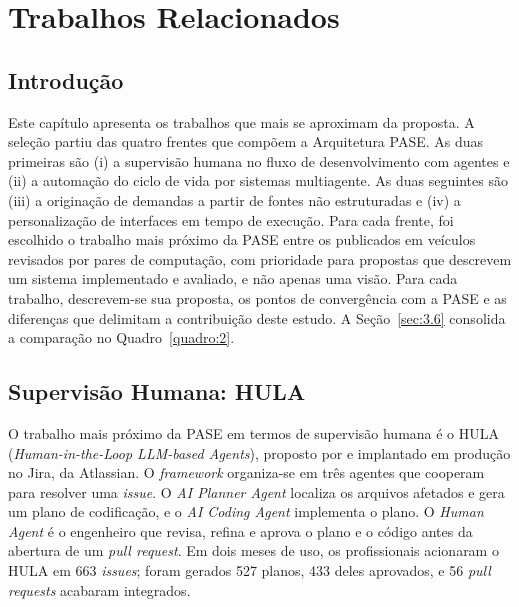 
\chapter{Trabalhos Relacionados}\label{cap:3}

\section{Introdução}\label{sec:3.1}

Este capítulo apresenta os trabalhos que mais se aproximam da proposta. A seleção partiu das quatro frentes que compõem a Arquitetura PASE. As duas primeiras são (i) a supervisão humana no fluxo de desenvolvimento com agentes e (ii) a automação do ciclo de vida por sistemas multiagente. As duas seguintes são (iii) a originação de demandas a partir de fontes não estruturadas e (iv) a personalização de interfaces em tempo de execução. Para cada frente, foi escolhido o trabalho mais próximo da PASE entre os publicados em veículos revisados por pares de computação, com prioridade para propostas que descrevem um sistema implementado e avaliado, e não apenas uma visão. Para cada trabalho, descrevem-se sua proposta, os pontos de convergência com a PASE e as diferenças que delimitam a contribuição deste estudo. A Seção~\ref{sec:3.6} consolida a comparação no Quadro~\ref{quadro:2}.

\section{Supervisão Humana: HULA}\label{sec:3.2}

O trabalho mais próximo da PASE em termos de supervisão humana é o HULA (\textit{Human-in-the-Loop LLM-based Agents}), proposto por  e implantado em produção no Jira, da Atlassian. O \textit{framework} organiza-se em três agentes que cooperam para resolver uma \textit{issue}. O \textit{AI Planner Agent} localiza os arquivos afetados e gera um plano de codificação, e o \textit{AI Coding Agent} implementa o plano. O \textit{Human Agent} é o engenheiro que revisa, refina e aprova o plano e o código antes da abertura de um \textit{pull request}. Em dois meses de uso, os profissionais acionaram o HULA em 663 \textit{issues}; foram gerados 527 planos, 433 deles aprovados, e 56 \textit{pull requests} acabaram integrados.

